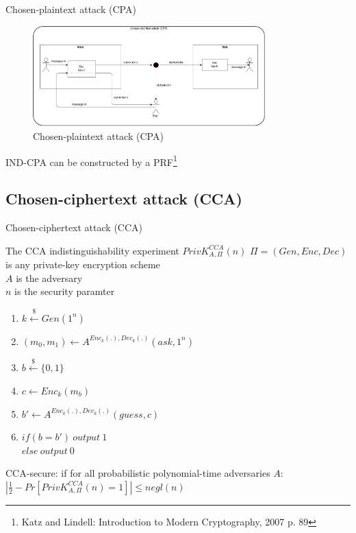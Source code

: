 \documentclass[ucs,9pt]{beamer}
\begin{document}
\begin{frame}{Chosen-plaintext attack (CPA)}
    
    \begin{figure}[h]
        \centering
        \includegraphics[width=0.8\textwidth]{figures/CPA.png}
        \caption{Chosen-plaintext attack (CPA)}
    \end{figure}
    IND-CPA can be constructed by a PRF\footnote{Katz and Lindell: Introduction to Modern Cryptography, 2007 p. 89}
\end{frame}



\subsection{Chosen-ciphertext attack (CCA)}
\begin{frame}{Chosen-ciphertext attack (CCA)}
    \begin{block}{The CCA indistinguishability experiment $ PrivK_{A,\Pi}^{CCA}(n) $}
        $\Pi = (Gen, Enc, Dec)$ is any private-key encryption scheme\\
        $A$ is the adversary\\
        $n$ is the security paramter\\
        \begin{enumerate}
            \item $k \overset{\$}{\leftarrow} Gen(1^n)$
            \item $(m_{0},m_{1}) \leftarrow A^{Enc_{k}(.), Dec_{k}(.)}(ask, 1^{n})$
            \item $b \overset{\$}{\leftarrow} \{0, 1\}$
            \item $c \leftarrow Enc_{k}(m_{b})$
            \item $b' \leftarrow A^{Enc_{k}(.), Dec_{k}(.)}(guess, c)$
            \item $if(b = b')\ output\ 1$ \\
            $else\ output\ 0$
        \end{enumerate}
        CCA-secure: if for all probabilistic polynomial-time adversaries $A$:\\
        $\left | \frac{1}{2} - Pr[PrivK_{A,\Pi}^{CCA}(n) = 1] \right | \leq negl(n)$
    \end{block}
\end{frame}
\end{document}
